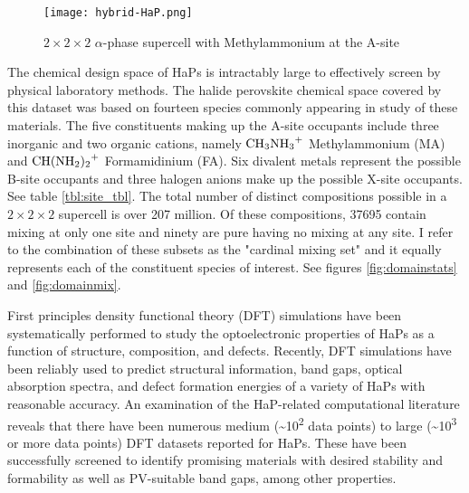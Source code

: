\begin{figure}[htbp]
\centering
\texttt{[image: hybrid-HaP.png]}
\caption{\(2\times{}2\times{}2\) \(\alpha\)-phase supercell with Methylammonium at the A-site}
\end{figure}

The chemical design space of HaPs is intractably large to effectively screen by physical laboratory methods.
The halide perovskite chemical space covered by this dataset was based on fourteen species commonly appearing in study of these materials.
The five constituents making up the A-site occupants include three inorganic and two organic cations, namely \(\ce{CH3NH3+}\) Methylammonium (MA) and \(\ce{CH(NH2)2+}\) Formamidinium (FA).
\autocite{yan-2016-defec-physic,dimesso-2016-inves-formam}
Six divalent metals represent the possible B-site occupants and three halogen anions make up the possible X-site occupants.
See table \ref{tbl:site_tbl}.
The total number of distinct compositions possible in a \(2\times{}2\times{}2\) supercell is over 207 million.
Of these compositions, 37695 contain mixing at only one site and ninety are pure having no mixing at any site.
I refer to the combination of these subsets as the "cardinal mixing set" and it equally represents each of the constituent species of interest.
See figures \ref{fig:domainstats} and \ref{fig:domainmix}.

First principles density functional theory (DFT) simulations have been systematically performed to study the optoelectronic properties of HaPs as a function of structure, composition, and defects.
Recently, DFT simulations have been reliably used to predict structural information, band gaps, optical absorption spectra, and defect formation energies of a variety of HaPs with reasonable accuracy.
\autocite{mannodi-kanakkithodi-2022-data-driven,yin-2015-halid-perov}
An examination of the HaP-related computational literature reveals that there have been numerous medium (\textasciitilde{}10\textsuperscript{2} data points) to large (\textasciitilde{}10\textsuperscript{3} or more data points) DFT datasets reported for HaPs.
\autocite{castelli-2014-bandg-calcul,park-2019-explor-new,kar-2018-comput-screen,pu-2021-screen-perov}
These have been successfully screened to identify promising materials with desired stability and formability as well as PV-suitable band gaps, among other properties.

